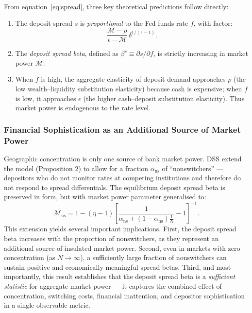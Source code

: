 \documentclass[12pt,a4paper]{article}
\begin{document}
From equation~\eqref{eq:spread}, three key theoretical predictions follow
directly:
\begin{enumerate}
  \item The deposit spread $s$ is \emph{proportional} to the Fed funds rate
    $f$, with factor:
    \[
      \frac{\mathcal{M}-\rho}{\epsilon-\mathcal{M}}\,
      \delta^{1/(\epsilon-1)}.
    \]
  \item The \emph{deposit spread beta}, defined as $\beta^s \equiv \partial s /
    \partial f$, is strictly increasing in market power $\mathcal{M}$.
  \item When $f$ is high, the aggregate elasticity of deposit demand approaches
    $\rho$ (the low wealth--liquidity substitution elasticity) because cash is
    expensive; when $f$ is low, it approaches $\epsilon$ (the higher
    cash--deposit substitution elasticity). Thus market power is endogenous to
    the rate level.
\end{enumerate}

\subsubsection{Financial Sophistication as an Additional Source of Market Power}

Geographic concentration is only one source of bank market power. DSS extend
the model (Proposition 2) to allow for a fraction $\alpha_{\text{ns}}$ of
``nonswitchers'' --- depositors who do not monitor rates at competing
institutions and therefore do not respond to spread differentials. The
equilibrium deposit spread beta is preserved in form, but with market power
parameter generalised to:
\begin{equation}
  \mathcal{M}_{\text{ns}} = 1 - (\eta-1)
  \left[ \frac{1}{\alpha_{\text{ns}} + (1-\alpha_{\text{ns}})\frac{1}{N}}
  - 1 \right]^{-1}.
  \label{eq:mns}
\end{equation}
This extension yields several important implications. First, the deposit spread
beta increases with the proportion of nonswitchers, as they represent an
additional source of insulated market power. Second, even in markets with zero
concentration (as $N \to \infty$), a sufficiently large fraction of
nonswitchers can sustain positive and economically meaningful spread betas.
Third, and most importantly, this result establishes that the deposit spread
beta is a \emph{sufficient statistic} for aggregate market power --- it
captures the combined effect of concentration, switching costs, financial
inattention, and depositor sophistication in a single observable metric.
\end{document}
